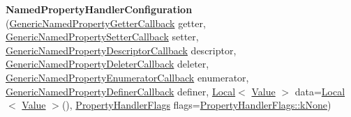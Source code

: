 \begin{DoxyCompactItemize}
{\bfseries Named\+Property\+Handler\+Configuration} (\mbox{\hyperlink{namespacev8_a24b1801fa53a7c5a71366d8044927563}{Generic\+Named\+Property\+Getter\+Callback}} getter, \mbox{\hyperlink{namespacev8_af74716c6e95a269c6cd4314662fd0a7e}{Generic\+Named\+Property\+Setter\+Callback}} setter, \mbox{\hyperlink{namespacev8_a8cf8faa26baffa84173a24906c0d49f6}{Generic\+Named\+Property\+Descriptor\+Callback}} descriptor, \mbox{\hyperlink{namespacev8_ad2aecc0406ea4bc02d5a4f84a433b273}{Generic\+Named\+Property\+Deleter\+Callback}} deleter, \mbox{\hyperlink{namespacev8_a20826eb7e52e84fa4f632534e8eddd04}{Generic\+Named\+Property\+Enumerator\+Callback}} enumerator, \mbox{\hyperlink{namespacev8_a66c854bc88d612ab4c65354bc0dc74a0}{Generic\+Named\+Property\+Definer\+Callback}} definer, \mbox{\hyperlink{classv8_1_1Local}{Local}}$<$ \mbox{\hyperlink{classv8_1_1Value}{Value}} $>$ data=\mbox{\hyperlink{classv8_1_1Local}{Local}}$<$ \mbox{\hyperlink{classv8_1_1Value}{Value}} $>$(), \mbox{\hyperlink{namespacev8_af4789f0aeb8680e353901a35810cac1a}{Property\+Handler\+Flags}} flags=\mbox{\hyperlink{namespacev8_af4789f0aeb8680e353901a35810cac1aa35c3ace1970663a16e5c65baa5941b13}{Property\+Handler\+Flags\+::k\+None}})
\end{DoxyCompactItemize}
